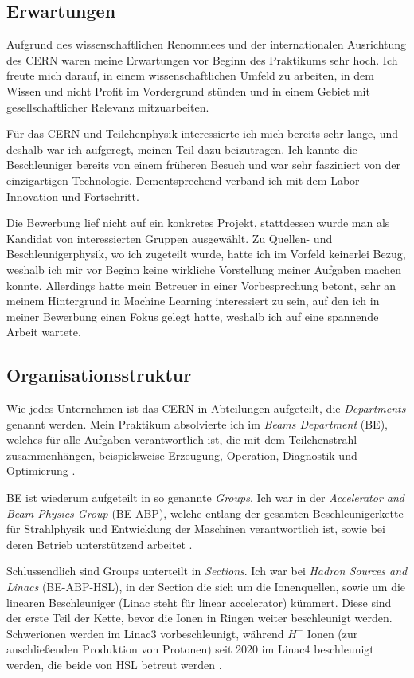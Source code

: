 \documentclass[11pt, a4paper, titlepage, headings=standardclasses]{scrartcl}
\begin{document}
\subsection*{Erwartungen}

Aufgrund des wissenschaftlichen Renommees und der internationalen Ausrichtung des CERN waren meine Erwartungen vor Beginn des Praktikums sehr hoch. Ich freute mich darauf, in einem wissenschaftlichen Umfeld zu arbeiten, in dem Wissen und nicht Profit im Vordergrund stünden und in einem Gebiet mit gesellschaftlicher Relevanz mitzuarbeiten.

Für das CERN und Teilchenphysik interessierte ich mich bereits sehr lange, und deshalb war ich aufgeregt, meinen Teil dazu beizutragen. Ich kannte die Beschleuniger bereits von einem früheren Besuch und war sehr fasziniert von der einzigartigen Technologie. Dementsprechend verband ich mit dem Labor Innovation und Fortschritt.

Die Bewerbung lief nicht auf ein konkretes Projekt, stattdessen wurde man als Kandidat von interessierten Gruppen ausgewählt. Zu Quellen- und Beschleunigerphysik, wo ich zugeteilt wurde, hatte ich im Vorfeld keinerlei Bezug, weshalb ich mir vor Beginn keine wirkliche Vorstellung meiner Aufgaben machen konnte. Allerdings hatte mein Betreuer in einer Vorbesprechung betont, sehr an meinem Hintergrund in Machine Learning interessiert zu sein, auf den ich in meiner Bewerbung einen Fokus gelegt hatte, weshalb ich auf eine spannende Arbeit wartete.

\subsection*{Organisationsstruktur}

Wie jedes Unternehmen ist das CERN in Abteilungen aufgeteilt, die \textit{Departments} genannt werden. Mein Praktikum absolvierte ich im \textit{Beams Department} (BE), welches für alle Aufgaben verantwortlich ist, die mit dem Teilchenstrahl zusammenhängen, beispielsweise Erzeugung, Operation, Diagnostik und Optimierung \cite{CERN:BE}.

BE ist wiederum aufgeteilt in so genannte \textit{Groups}. Ich war in der \textit{Accelerator and Beam Physics Group} (BE-ABP), welche entlang der gesamten Beschleunigerkette für Strahlphysik und Entwicklung der Maschinen verantwortlich ist, sowie bei deren Betrieb unterstützend arbeitet \cite{CERN:BE-ABP}.

Schlussendlich sind Groups unterteilt in \textit{Sections}. Ich war bei \textit{Hadron Sources and Linacs} (BE-ABP-HSL), in der Section die sich um die Ionenquellen, sowie um die linearen Beschleuniger (Linac steht für linear accelerator) kümmert. Diese sind der erste Teil der Kette, bevor die Ionen in Ringen weiter beschleunigt werden. Schwerionen werden im Linac3 vorbeschleunigt, während $H^-$ Ionen (zur anschließenden Produktion von Protonen) seit 2020 im Linac4 beschleunigt werden, die beide von HSL betreut werden \cite{CERN:BE-ABP-HSL}.
\end{document}
